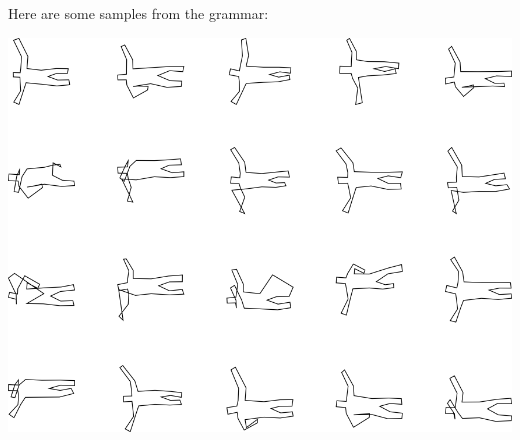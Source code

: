 Here are some samples from the grammar:

\includegraphics[width=6in]{output/3.learning/incremental/gram.22.d/samples.png}

